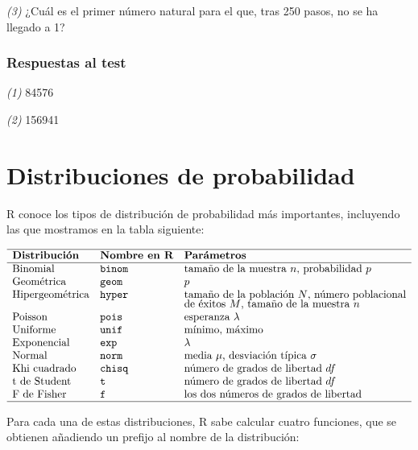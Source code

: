 \documentclass[]{book}
\theoremstyle{definition}
\theoremstyle{definition}
\theoremstyle{definition}
\theoremstyle{remark}
\begin{document}
\emph{(3)} ¿Cuál es el primer número natural para el que, tras 250 pasos, no se ha llegado a 1?

\hypertarget{respuestas-al-test-5}{%
\subsection*{Respuestas al test}\label{respuestas-al-test-5}}

\emph{(1)} 84576

\emph{(2)} 156941

\hypertarget{chap:distr}{%
\chapter{Distribuciones de probabilidad}\label{chap:distr}}

R conoce los tipos de distribución de probabilidad más importantes, incluyendo las que mostramos en la tabla siguiente:

\[
\begin{array}{lll}
\hline
\textbf{Distribución} & {\textbf{Nombre en R}} & {\textbf{Parámetros}}\\ \hline
\mbox{Binomial} &{\texttt{binom}} & \mbox{tamaño de la muestra $n$, probabilidad $p$}\\
\mbox{Geométrica} & {\texttt{geom}} & \mbox{$p$}\\
\mbox{Hipergeométrica} & {\texttt{hyper}} & \mbox{tamaño de la población $N$, número poblacional}\\[-0.75ex] 
& & \mbox{de éxitos $M$, tamaño de la muestra $n$}\\
\mbox{Poisson} & {\texttt{pois}} & \mbox{esperanza $\lambda$}\\
\mbox{Uniforme} & {\texttt{unif}} & \mbox{mínimo, máximo}\\
\mbox{Exponencial} & {\texttt{exp}} & \lambda\\
\mbox{Normal} & {\texttt{norm}} & \mbox{media $\mu$, desviación típica $\sigma$}\\
\mbox{Khi cuadrado} & {\texttt{chisq}} & \mbox{número de grados de libertad $df$}\\
\mbox{t de Student} & {\texttt{t}} & \mbox{número de grados de libertad $df$}\\
\mbox{F de Fisher} & {\texttt{f}} & \mbox{los dos números de  grados de libertad}
\\ \hline
\end{array}
\]

Para cada una de estas distribuciones, R sabe calcular cuatro funciones, que se obtienen añadiendo un prefijo al nombre de la distribución:
\end{document}
